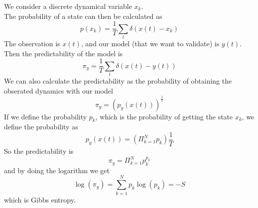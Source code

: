 We consider a discrete dynamical variable $x_k$. \\
The probability of a state can then be calculated as
$$
	p(x_k) = \frac{1}{T}\sum_t \delta(x(t)-x_k)
$$
The observation is $x(t)$, and our model (that we want to validate) is $y(t)$. Then the predictability of the model is
$$
	\pi_y = \frac{1}{T}\sum_t \delta(x(t)-y(t))
$$
We can also calculate the predictability as the probability of obtaining the obserated dynamics with our model
$$
	\pi_y = \left(p_y(x(t))\right)^\frac{1}{T}
$$
If we define the probability $p_k$, which is the probability of getting the state $x_k$, we define the probability as
$$
	p_y(x(t)) = \left(\Pi_{k=1}^N p_k \right)\frac{1}{T}
$$
So the predictability is
$$
	\pi_y = \Pi_{k=1}^N p_k^{p_k}
$$
and by doing the logarithm we get
$$
	\log(\pi_y) = \sum_{k=1}^N p_k\log(p_k) = -S
$$
which is Gibbs entropy.
